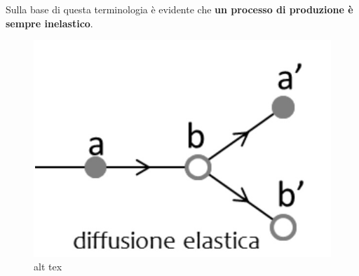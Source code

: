 \documentclass[]{tufte-book}
\theoremstyle{definition}
\theoremstyle{theorem}
\theoremstyle{plain}
\theoremstyle{remark}
\theoremstyle{remark}
\begin{document}
Sulla base di questa terminologia è evidente che \textbf{un processo di
produzione è sempre inelastico}.

\begin{marginfigure}
\begin{figure}
\centering
\includegraphics{../figs/diffusione-elastica.jpg}
\caption{alt tex}
\end{figure}
\end{marginfigure}


\end{document}

